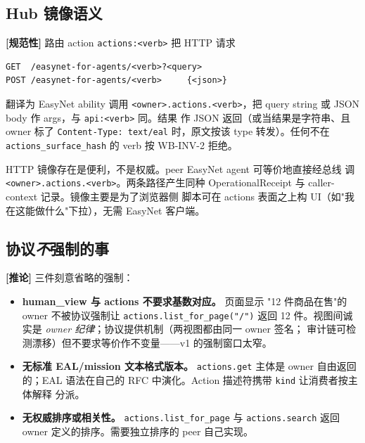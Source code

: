\documentclass[11pt,a4paper]{article}
\newcommand{\normsv}{\textcolor{normativecolor}{\textbf{[规范性]}}\xspace}
\newcommand{\derived}{\textcolor{derivedcolor}{\textbf{[推论]}}\xspace}
\theoremstyle{definition}
\begin{document}
\subsection{Hub 镜像语义}

\normsv{} 路由 action \texttt{actions:<verb>} 把 HTTP 请求

\begin{lstlisting}
GET  /easynet-for-agents/<verb>?<query>
POST /easynet-for-agents/<verb>     {<json>}
\end{lstlisting}

翻译为 EasyNet ability 调用 \texttt{<owner>.actions.<verb>}，把
query string 或 JSON body 作 args，与 \texttt{api:<verb>} 同。结果
作 JSON 返回（或当结果是字符串、且 owner 标了
\texttt{Content-Type: text/eal} 时，原文按该 type 转发）。任何不在
\texttt{actions\_surface\_hash} 的 verb 按 WB-INV-2 拒绝。

\begin{notebox}
HTTP 镜像存在是便利，不是权威。peer EasyNet agent 可等价地直接经总线
调 \texttt{<owner>.actions.<verb>}。两条路径产生同种
OperationalReceipt 与 caller-context 记录。镜像主要是为了浏览器侧
脚本可在 actions 表面之上构 UI（如"我在这能做什么"下拉），无需
EasyNet 客户端。
\end{notebox}

\subsection{协议\emph{不}强制的事}

\derived{} 三件刻意省略的强制：

\begin{itemize}[leftmargin=2em,itemsep=0.18em]
    \item \textbf{human\_view 与 actions 不要求基数对应。} 页面显示
    "12 件商品在售"的 owner 不被协议强制让
    \texttt{actions.list\_for\_page("/")} 返回 12 件。视图间诚实是
    \emph{owner 纪律}；协议提供机制（两视图都由同一 owner 签名；
    审计链可检测漂移）但不要求等价作不变量——v1 的强制窗口太窄。
    \item \textbf{无标准 EAL/mission 文本格式版本。}
    \texttt{actions.get} 主体是 owner 自由返回的；EAL 语法在自己的
    RFC 中演化。Action 描述符携带 \texttt{kind} 让消费者按主体解释
    分派。
    \item \textbf{无权威排序或相关性。}
    \texttt{actions.list\_for\_page} 与 \texttt{actions.search} 返回
    owner 定义的排序。需要独立排序的 peer 自己实现。
\end{itemize}
\end{document}
